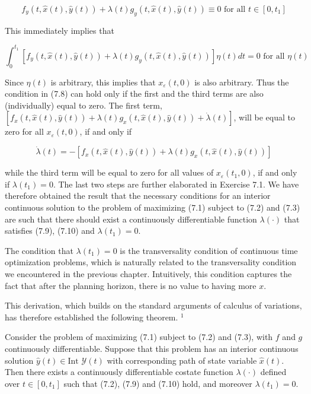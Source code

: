 \documentclass[\topdir/lecture_notes.tex]{subfiles}
\begin{document}
\[
f_{y}(t, \hat{x}(t), \hat{y}(t))+\lambda(t) g_{y}(t, \hat{x}(t), \hat{y}(t)) \equiv 0 \text { for all } t \in\left[0, t_{1}\right]
\]

This immediately implies that

\[
\int_{0}^{t_{1}}\left[f_{y}(t, \hat{x}(t), \hat{y}(t))+\lambda(t) g_{y}(t, \hat{x}(t), \hat{y}(t))\right] \eta(t) d t=0 \text { for all } \eta(t)
\]

Since $\eta(t)$ is arbitrary, this implies that $x_{\varepsilon}(t, 0)$ is also arbitrary. Thus the condition in (7.8) can hold only if the first and the third terms are also (individually) equal to zero. The first term, $\left[f_{x}(t, \hat{x}(t), \hat{y}(t))+\lambda(t) g_{x}(t, \hat{x}(t), \hat{y}(t))+\dot{\lambda}(t)\right]$, will be equal to zero for all $x_{\varepsilon}(t, 0)$, if and only if

\[
\dot{\lambda}(t)=-\left[f_{x}(t, \hat{x}(t), \hat{y}(t))+\lambda(t) g_{x}(t, \hat{x}(t), \hat{y}(t))\right]
\]

while the third term will be equal to zero for all values of $x_{\varepsilon}\left(t_{1}, 0\right)$, if and only if $\lambda\left(t_{1}\right)=0$. The last two steps are further elaborated in Exercise 7.1. We have therefore obtained the result that the necessary conditions for an interior continuous solution to the problem of maximizing (7.1) subject to (7.2) and (7.3) are such that there should exist a continuously differentiable function $\lambda(\cdot)$ that satisfies (7.9), (7.10) and $\lambda\left(t_{1}\right)=0$.

The condition that $\lambda\left(t_{1}\right)=0$ is the transversality condition of continuous time optimization problems, which is naturally related to the transversality condition we encountered in the previous chapter. Intuitively, this condition captures the fact that after the planning horizon, there is no value to having more $x$.

This derivation, which builds on the standard arguments of calculus of variations, has therefore established the following theorem. ${ }^{1}$

\begin{theorem}
Consider the problem of maximizing (7.1) subject to (7.2) and (7.3), with $f$ and $g$ continuously differentiable. Suppose that this problem has an interior continuous solution $\hat{y}(t) \in \text{Int } \mathcal{Y}(t)$ with corresponding path of state variable $\hat{x}(t)$. Then there exists a continuously differentiable costate function $\lambda(\cdot)$ defined over $t \in \left[0, t_1\right]$ such that (7.2), (7.9) and (7.10) hold, and moreover $\lambda\left(t_1\right)=0$.
\end{theorem}
\end{document}
